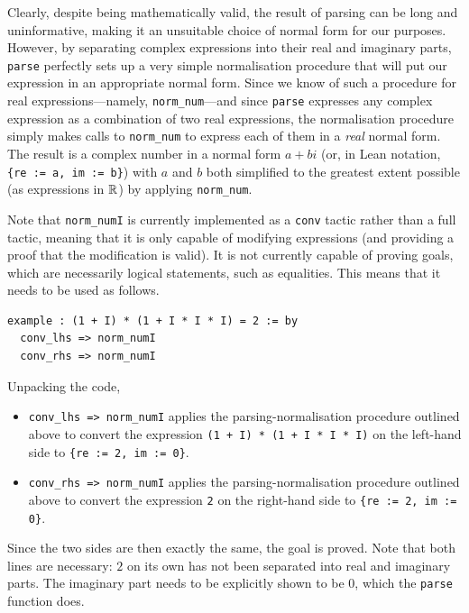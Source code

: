 Clearly, despite being mathematically valid, the result of parsing can be long and uninformative, making it an unsuitable choice of normal form for our purposes. However, by separating complex expressions into their real and imaginary parts, \lstinline|parse| perfectly sets up a very simple normalisation procedure that will put our expression in an appropriate normal form. Since we know of such a procedure for real expressions---namely, \lstinline|norm_num|---and since \lstinline|parse| expresses any complex expression as a combination of two real expressions, the normalisation procedure simply makes calls to \lstinline|norm_num| to express each of them in a \textit{real} normal form. The result is a complex number in a normal form $a + bi$ (or, in Lean notation, \lstinline|{re := a, im := b}|) with $a$ and $b$ both simplified to the greatest extent possible (as expressions in $\mathbb{R}$) by applying \lstinline|norm_num|.

Note that \lstinline|norm_numI| is currently implemented as a \lstinline|conv| tactic rather than a full tactic, meaning that it is only capable of modifying expressions (and providing a proof that the modification is valid). It is not currently capable of proving goals, which are necessarily logical statements, such as equalities. This means that it needs to be used as follows.

\begin{lstlisting}[caption=Using \lstinline|norm_numI| as a \lstinline|conv| tactic, label=Ch5:Listing:norm_numI_as_conv]
example : (1 + I) * (1 + I * I * I) = 2 := by
  conv_lhs => norm_numI
  conv_rhs => norm_numI
\end{lstlisting}

Unpacking the code,
\begin{itemize}
    \item \lstinline|conv_lhs => norm_numI| applies the parsing-normalisation procedure outlined above to convert the expression \lstinline|(1 + I) * (1 + I * I * I)| on the left-hand side to \lstinline|{re := 2, im := 0}|.
    \item \lstinline|conv_rhs => norm_numI| applies the parsing-normalisation procedure outlined above to convert the expression \lstinline|2| on the right-hand side to \lstinline|{re := 2, im := 0}|.
\end{itemize} 
Since the two sides are then exactly the same, the goal is proved. Note that both lines are necessary: $2$ on its own has not been separated into real and imaginary parts. The imaginary part needs to be explicitly shown to be $0$, which the \lstinline|parse| function does.

